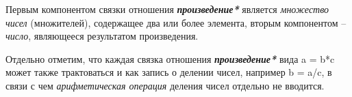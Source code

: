 Первым компонентом связки отношения \textbf{\textit{произведение*}} является \textit{множество чисел} (множителей), содержащее два или более элемента, вторым компонентом -- \textit{число}, являющееся результатом произведения.
		
Отдельно отметим, что каждая связка отношения \textbf{\textit{произведение*}} вида a = b*c может также трактоваться и как запись о делении чисел, например b = a/c, в связи с чем \textit{арифметическая операция} деления чисел отдельно не вводится.
	
%		
%		
	
%	
	
